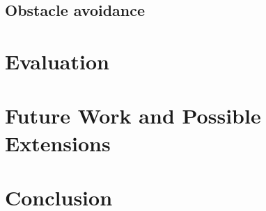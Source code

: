 \documentclass[twoside, 12pt]{article}
\begin{document}
\subsection{Obstacle avoidance}


\section{Evaluation}
\label{sec:eval}


\section{Future Work and Possible Extensions}
\label{sec:future}


\section{Conclusion}
\label{sec:conclusion}

\newpage

{}

\end{document}
